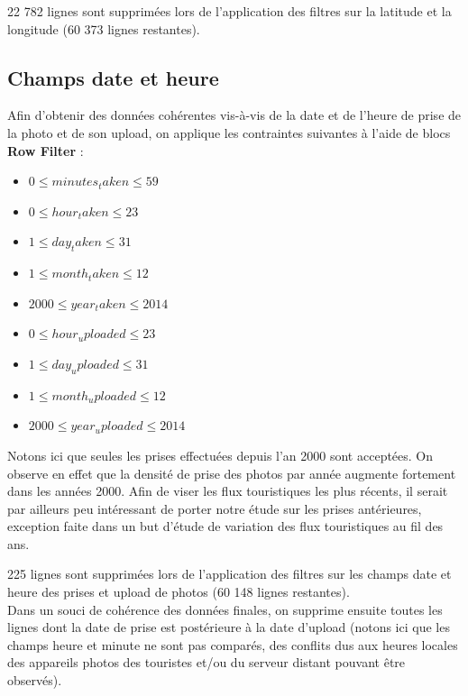 22 782 lignes sont supprimées lors de l'application des filtres sur la latitude et la longitude (60 373 lignes restantes).


\subsection{Champs date et heure}
Afin d'obtenir des données cohérentes vis-à-vis de la date et de l'heure de prise de la photo et de son upload, on applique les contraintes suivantes à l'aide de blocs \textbf{Row Filter} :
\begin{itemize}
    \item $ 0 \leq minutes_taken \leq 59 $
    \item $ 0 \leq hour_taken \leq 23 $
    \item $ 1 \leq day_taken \leq 31 $
    \item $ 1 \leq month_taken \leq 12 $
    \item $ 2000 \leq year_taken \leq 2014 $\\

    \item $ 0 \leq hour_uploaded \leq 23 $
    \item $ 1 \leq day_uploaded \leq 31 $
    \item $ 1 \leq month_uploaded \leq 12 $
    \item $ 2000 \leq year_uploaded \leq 2014 $\\
\end{itemize}

Notons ici que seules les prises effectuées depuis l'an 2000 sont acceptées. On observe en effet que la densité de prise des photos par année augmente fortement dans les années 2000.
Afin de viser les flux touristiques les plus récents, il serait par ailleurs peu intéressant de porter notre étude sur les prises antérieures, exception faite dans un but d'étude de variation des flux touristiques au fil des ans.

225 lignes sont supprimées lors de l'application des filtres sur les champs date et heure des prises et upload de photos (60 148 lignes restantes).\\

Dans un souci de cohérence des données finales, on supprime ensuite toutes les lignes dont la date de prise est postérieure à la date d'upload (notons ici que les champs heure et minute ne sont pas comparés, des conflits dus aux heures locales des appareils photos des touristes et/ou du serveur distant pouvant être observés).

